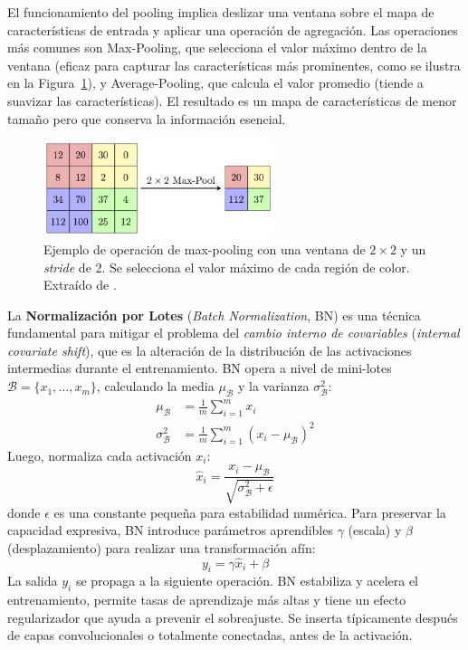 \documentclass[11pt,spanish,listoffigures,listoftables]{tfgetsinf}
\begin{document}
El funcionamiento del pooling implica deslizar una ventana sobre el mapa de características de entrada y aplicar una operación de agregación. Las operaciones más comunes son Max-Pooling, que selecciona el valor máximo dentro de la ventana (eficaz para capturar las características más prominentes, como se ilustra en la Figura~\ref{fig:pooling}), y Average-Pooling, que calcula el valor promedio (tiende a suavizar las características). El resultado es un mapa de características de menor tamaño pero que conserva la información esencial.

\begin{figure}[H]
   \centering
   \includegraphics[width=0.6\textwidth]{images/estado_del_arte/max_pooling.png}
   \caption[Ejemplo de operación de max-pooling con una ventana de $2 \times 2$ y un \textit{stride} de 2]{Ejemplo de operación de max-pooling con una ventana de $2 \times 2$ y un \textit{stride} de 2. Se selecciona el valor máximo de cada región de color. Extraído de \cite{csWikiMaxpoolSample}.}
   \label{fig:pooling}
\end{figure}

La \textbf{Normalización por Lotes} (\textit{Batch Normalization}, BN) es una técnica fundamental para mitigar el problema del \textit{cambio interno de covariables} (\textit{internal covariate shift}), que es la alteración de la distribución de las activaciones intermedias durante el entrenamiento. BN opera a nivel de mini-lotes $\mathcal{B} = \{x_1, \dots, x_m\}$, calculando la media $\mu_{\mathcal{B}}$ y la varianza $\sigma^2_{\mathcal{B}}$:
\begin{align}
   \mu_{\mathcal{B}} &= \frac{1}{m} \sum_{i=1}^{m} x_i \\
   \sigma^2_{\mathcal{B}} &= \frac{1}{m} \sum_{i=1}^{m} (x_i - \mu_{\mathcal{B}})^2
\end{align}
Luego, normaliza cada activación $x_i$:
\begin{equation}
   \hat{x}_i = \frac{x_i - \mu_{\mathcal{B}}}{\sqrt{\sigma^2_{\mathcal{B}} + \epsilon}}
\end{equation}
donde $\epsilon$ es una constante pequeña para estabilidad numérica. Para preservar la capacidad expresiva, BN introduce parámetros aprendibles $\gamma$ (escala) y $\beta$ (desplazamiento) para realizar una transformación afín:
\begin{equation}
   y_i = \gamma \hat{x}_i + \beta
\end{equation}
La salida $y_i$ se propaga a la siguiente operación. BN estabiliza y acelera el entrenamiento, permite tasas de aprendizaje más altas y tiene un efecto regularizador que ayuda a prevenir el sobreajuste. Se inserta típicamente después de capas convolucionales o totalmente conectadas, antes de la activación.
\end{document}
